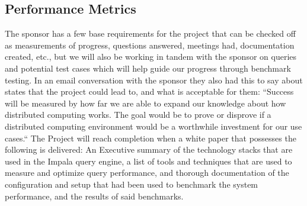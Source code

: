 \documentclass[letterpaper,10pt,fleqn,draftclsnofoot,onecolumn]{IEEEtran}
\begin{document}
	
	
	\subsection{\textbf{Performance Metrics}}
	 \indent The sponsor has a few base requirements for the project that can be checked off as measurements of progress, questions answered, meetings had, documentation created, etc., but we will also be working in tandem with the sponsor on queries and potential test cases which will help guide our progress through benchmark testing.\newline\newline
	\indent In an email conversation with the sponsor they also had this to say about states that the project could lead to, and what is acceptable for them:\newline\newline
	“Success will be measured by how far we are able to expand our knowledge about how distributed computing works. The goal would be to prove or disprove if a distributed computing environment would be a worthwhile investment for our use cases.“\newline\newline
	\indent The Project will reach completion when a white paper that possesses the following is delivered: An Executive summary of the technology stacks that are used in the Impala query engine, a list of tools and techniques that are used to measure and optimize query performance, and thorough documentation of the configuration and setup that had been used to benchmark the system performance, and the results of said benchmarks.
	
	

	
\end{document}
